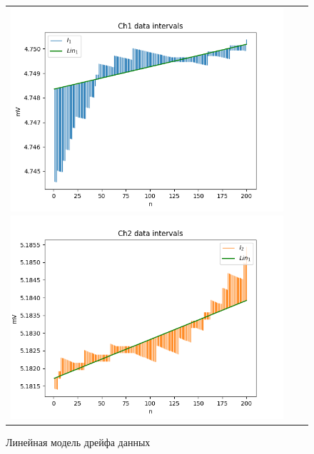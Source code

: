 \documentclass[a4paper,14pt]{article}
\begin{document}
	\begin{figure}[H]
		\begin{tabular}{ccc}
			\includegraphics[scale=0.5]{../image/lr_PR1.png}
			\includegraphics[scale=0.5]{../image/lr_PR2.png}
		\end{tabular}
		\caption{Линейная модель дрейфа данных} 
	\end{figure}
	
\end{document}
